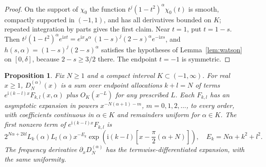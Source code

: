 \documentclass[11pt]{article}
\numberwithin{equation}{section}
\newtheorem{proposition}[theorem]{Proposition}
\theoremstyle{remark}
\newcommand{\ii}{\mathrm{i}}
\begin{document}
\begin{proof}
On the support of $\chi_0$ the function $t^j(1-t^2)^\alpha\chi_0(t)$ is
smooth, compactly supported in $(-1,1)$, and has all derivatives
bounded on $K$; repeated integration by parts gives the first claim.
Near $t=1$, put $t=1-s$. Then
$t^j(1-t^2)^\alpha e^{\ii xt}
 =e^{\ii x}s^\alpha\,(1-s)^j(2-s)^\alpha e^{-\ii xs}$, and
$h(s,\alpha)=(1-s)^j(2-s)^\alpha$ satisfies the hypotheses of
Lemma~\ref{lem:watson} on $[0,\delta]$, because $2-s\ge3/2$ there.
The endpoint $t=-1$ is symmetric.
\end{proof}

\begin{proposition}\label{prop:corners}
Fix $N\ge1$ and a compact interval $K\subset(-1,\infty)$. For real
$x\ge1$, $D_N^{(\alpha)}(x)$ is a sum over endpoint allocations
$k+l=N$ of terms $e^{\ii(k-l)x}F_{k,l}(x,\alpha)$ plus $O_K(x^{-L})$
for any prescribed $L$. Each $F_{k,l}$ has an asymptotic expansion in
powers $x^{-N(\alpha+1)-m}$, $m=0,1,2,\ldots$, to every order, with
coefficients continuous in $\alpha\in K$ and remainders uniform for
$\alpha\in K$. The first nonzero term of $e^{\ii(k-l)x}F_{k,l}$ is
\begin{equation}\label{eq:corner}
 2^{N\alpha+2kl}L_k(\alpha)L_l(\alpha)
 x^{-E_k}
 \exp\!\left(\ii(k-l)
             \left[x-\frac\pi2(\alpha+N)\right]\right),
 \quad E_k=N\alpha+k^2+l^2.
\end{equation}
The frequency derivative $\partial_xD_N^{(\alpha)}$ has the
termwise-differentiated expansion, with the same uniformity.
\end{proposition}
\end{document}
